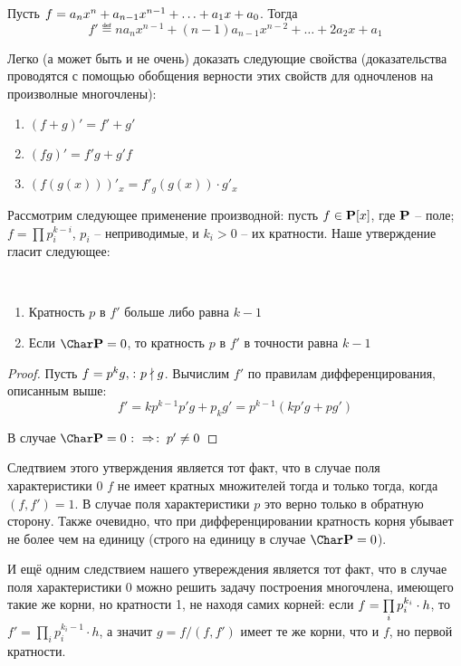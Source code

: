 Пусть $f=a_nx^n+a_{n-1}x^{n-1}\bw+\dots\bw+a_1x\bw+a_0$. Тогда
$$f'\eqdef na_nx^{n-1}+(n-1)a_{n-1}x^{n-2}+\dots+2a_2x+a_1$$

Легко (а может быть и не очень) доказать следующие свойства (доказательства проводятся с помощью обобщения верности этих свойств для одночленов на произволные многочлены):

\begin{enumerate}
  \item $(f+g)'=f'+g'$
  \item $(fg)'=f'g+g'f$
  \item $(f(g(x)))'_x=f'_g(g(x))\cdot g'_x$
\end{enumerate}

Рассмотрим следующее применение производной: пусть $f\in\mathbf{P}[x]$, где $\mathbf{P}$ -- поле; $f=\prod\limits p_i^{k-i}$, $p_i$ -- неприводимые, и $k_i>0$ -- их кратности. Наше утверждение гласит следующее:
\begin{theorem}\par\strut\\
\begin{enumerate}
  \item Кратность $p$ в $f'$ больше либо равна $k-1$
  \item Если $\Char\Pb=0$, то кратность $p$ в $f'$ в точности равна $k-1$
\end{enumerate}
\end{theorem}
\begin{proof}
  Пусть $f=p^kg,\colon p\nmid g$. Вычислим $f'$ по правилам дифференцирования, описанным выше:
  $$f'=kp^{k-1}p'g+p_kg'=p^{k-1}(kp'g+pg')$$
  
  В случае $\Char\Pb=0\ra p'\ne0$
\end{proof}

Следтвием этого утверждения является тот факт, что в случае поля характеристики 0 $f$ не имеет кратных множителей тогда и только тогда, когда $(f,f')=1$. В случае поля характеристики $p$ это верно только в обратную сторону. Также очевидно, что при дифференцировании кратность корня убывает не более чем на единицу (строго на единицу в случае $\Char\Pb=0$).

И ещё одним следствием нашего утвереждения является тот факт, что в случае поля характеристики 0 можно решить задачу построения многочлена, имеющего такие же корни, но кратности 1, не находя самих корней: если $f\bw=\prod\limits_ip_i^{k_i}\cdot h$, то $f'=\prod\limits_ip_i^{k_i-1}\cdot h$, а значит $g=f/(f,f')$ имеет те же корни, что и $f$, но первой кратности.

